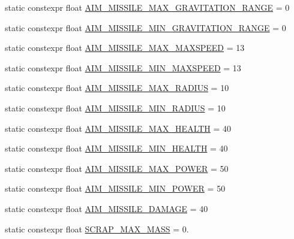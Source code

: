 \begin{DoxyCompactItemize}
\item 
static constexpr float \hyperlink{class_act_conf_a7cfde462f70f9ccadfb3f8de92f3892e}{A\+I\+M\+\_\+\+M\+I\+S\+S\+I\+L\+E\+\_\+\+M\+A\+X\+\_\+\+G\+R\+A\+V\+I\+T\+A\+T\+I\+O\+N\+\_\+\+R\+A\+N\+G\+E} = 0
\item 
static constexpr float \hyperlink{class_act_conf_a756341ee3c9e00ebd3d24d186f2d3384}{A\+I\+M\+\_\+\+M\+I\+S\+S\+I\+L\+E\+\_\+\+M\+I\+N\+\_\+\+G\+R\+A\+V\+I\+T\+A\+T\+I\+O\+N\+\_\+\+R\+A\+N\+G\+E} = 0
\item 
static constexpr float \hyperlink{class_act_conf_a6a667ef2cb278b95249897e977438086}{A\+I\+M\+\_\+\+M\+I\+S\+S\+I\+L\+E\+\_\+\+M\+A\+X\+\_\+\+M\+A\+X\+S\+P\+E\+E\+D} = 13
\item 
static constexpr float \hyperlink{class_act_conf_aa2b499409c5c84f28210aabc2883ec77}{A\+I\+M\+\_\+\+M\+I\+S\+S\+I\+L\+E\+\_\+\+M\+I\+N\+\_\+\+M\+A\+X\+S\+P\+E\+E\+D} = 13
\item 
static constexpr float \hyperlink{class_act_conf_ad333fc03f69258202837acc5b58d9dfa}{A\+I\+M\+\_\+\+M\+I\+S\+S\+I\+L\+E\+\_\+\+M\+A\+X\+\_\+\+R\+A\+D\+I\+U\+S} = 10
\item 
static constexpr float \hyperlink{class_act_conf_a449ba6616f4daa21eac25801f7093c0c}{A\+I\+M\+\_\+\+M\+I\+S\+S\+I\+L\+E\+\_\+\+M\+I\+N\+\_\+\+R\+A\+D\+I\+U\+S} = 10
\item 
static constexpr float \hyperlink{class_act_conf_a9494c0ec322512e98bc9f5342c2ede69}{A\+I\+M\+\_\+\+M\+I\+S\+S\+I\+L\+E\+\_\+\+M\+A\+X\+\_\+\+H\+E\+A\+L\+T\+H} = 40
\item 
static constexpr float \hyperlink{class_act_conf_a6d5b2b58fdfe561f358d8621116bb8da}{A\+I\+M\+\_\+\+M\+I\+S\+S\+I\+L\+E\+\_\+\+M\+I\+N\+\_\+\+H\+E\+A\+L\+T\+H} = 40
\item 
static constexpr float \hyperlink{class_act_conf_a58408beb17f88eaa7bb0c325be55d93d}{A\+I\+M\+\_\+\+M\+I\+S\+S\+I\+L\+E\+\_\+\+M\+A\+X\+\_\+\+P\+O\+W\+E\+R} = 50
\item 
static constexpr float \hyperlink{class_act_conf_a966fde5475ede8298c78d4f7479689f2}{A\+I\+M\+\_\+\+M\+I\+S\+S\+I\+L\+E\+\_\+\+M\+I\+N\+\_\+\+P\+O\+W\+E\+R} = 50
\item 
static constexpr float \hyperlink{class_act_conf_ab5b9504a164684a3184baa14ca2ff23f}{A\+I\+M\+\_\+\+M\+I\+S\+S\+I\+L\+E\+\_\+\+D\+A\+M\+A\+G\+E} = 40
\item 
static constexpr float \hyperlink{class_act_conf_a7ca908964208c27ea40962fda8eb951e}{S\+C\+R\+A\+P\+\_\+\+M\+A\+X\+\_\+\+M\+A\+S\+S} = 0.
\item 

\end{DoxyCompactItemize}
